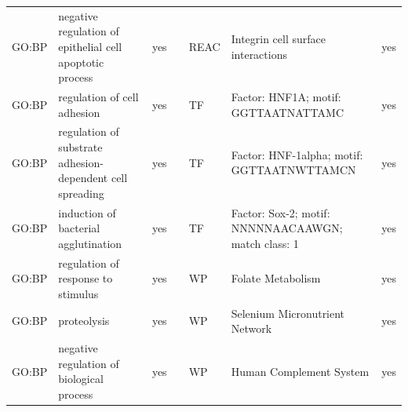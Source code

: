 \begin{longtable}{@{}lp{5cm}lllp{5cm}l@{}}
GO:BP           & negative regulation of epithelial cell apoptotic process                                                                           & yes              &           & REAC            & Integrin cell surface interactions                                                                                                                                     & yes              \\
GO:BP           & regulation of cell adhesion                                                                                                        & yes              &           & TF              & Factor: HNF1A; motif: GGTTAATNATTAMC                                                                                                                                   & yes              \\
GO:BP           & regulation of substrate adhesion-dependent cell spreading                                                                          & yes              &           & TF              & Factor: HNF-1alpha; motif: GGTTAATNWTTAMCN                                                                                                                             & yes              \\
GO:BP           & induction of bacterial agglutination                                                                                               & yes              &           & TF              & Factor: Sox-2; motif: NNNNNAACAAWGN; match class: 1                                                                                                                    & yes              \\
GO:BP           & regulation of response to stimulus                                                                                                 & yes              &           & WP              & Folate Metabolism                                                                                                                                                      & yes              \\
GO:BP           & proteolysis                                                                                                                        & yes              &           & WP              & Selenium Micronutrient Network                                                                                                                                         & yes              \\
GO:BP           & negative regulation of biological process                                                                                          & yes              &           & WP              & Human Complement System                                                                                                                                                & yes              \\

\end{longtable}
